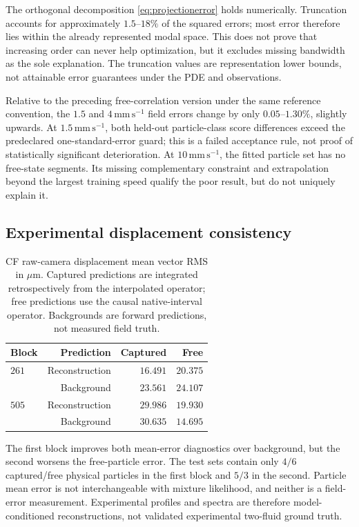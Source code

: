 \documentclass[11pt]{article}
\numberwithin{equation}{section}
\begin{document}
The orthogonal decomposition \eqref{eq:projectionerror} holds numerically. Truncation accounts for approximately $1.5$--$18\%$ of the squared errors; most error therefore lies within the already represented modal space. This does not prove that increasing order can never help optimization, but it excludes missing bandwidth as the sole explanation. The truncation values are representation lower bounds, not attainable error guarantees under the PDE and observations.

Relative to the preceding free-correlation version under the same reference convention, the $1.5$ and $4\,\mathrm{mm\,s^{-1}}$ field errors change by only $0.05$--$1.30\%$, slightly upwards. At $1.5\,\mathrm{mm\,s^{-1}}$, both held-out particle-class score differences exceed the predeclared one-standard-error guard; this is a failed acceptance rule, not proof of statistically significant deterioration. At $10\,\mathrm{mm\,s^{-1}}$, the fitted particle set has no free-state segments. Its missing complementary constraint and extrapolation beyond the largest training speed qualify the poor result, but do not uniquely explain it.

\subsection{Experimental displacement consistency}

\begin{table}[htbp]
 \centering
 \caption{CF raw-camera displacement mean vector RMS in $\mu\mathrm m$. Captured predictions are integrated retrospectively from the interpolated operator; free predictions use the causal native-interval operator. Backgrounds are forward predictions, not measured field truth.}
 \label{tab:cfcurrent}
 \begin{tabular}{lrrr}
 \toprule
 Block & Prediction & Captured & Free\\
 \midrule
 $261$ & Reconstruction & $16.491$ & $20.375$\\
       & Background     & $23.561$ & $24.107$\\
 $505$ & Reconstruction & $29.986$ & $19.930$\\
       & Background     & $30.635$ & $14.695$\\
 \bottomrule
 \end{tabular}
\end{table}

The first block improves both mean-error diagnostics over background, but the second worsens the free-particle error. The test sets contain only $4/6$ captured/free physical particles in the first block and $5/3$ in the second. Particle mean error is not interchangeable with mixture likelihood, and neither is a field-error measurement. Experimental profiles and spectra are therefore model-conditioned reconstructions, not validated experimental two-fluid ground truth.
\end{document}
